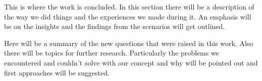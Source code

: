 This is where the work is concluded. In this section there will be a description of the way we did things and the experiences we made during it. An emphasis will be on the insights and the findings from the scenarios will get outlined.

Here will be a summary of the new questions that were raised in this work. Also there will be topics for further research. Particularly the problems we encountered and couldn't solve with our concept and why will be pointed out and first approaches will be suggested.